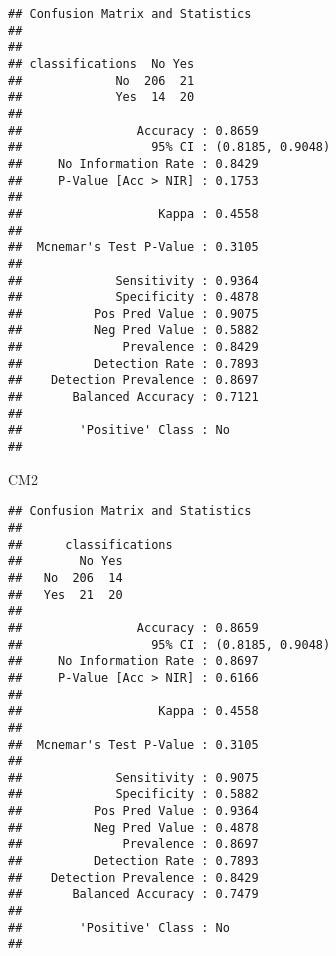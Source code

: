 \documentclass[]{article}
\newenvironment{Shaded}{\begin{snugshade}}{\end{snugshade}}
\newcommand{\NormalTok}[1]{#1}
\begin{document}
\begin{verbatim}
## Confusion Matrix and Statistics
## 
##                
## classifications  No Yes
##             No  206  21
##             Yes  14  20
##                                           
##                Accuracy : 0.8659          
##                  95% CI : (0.8185, 0.9048)
##     No Information Rate : 0.8429          
##     P-Value [Acc > NIR] : 0.1753          
##                                           
##                   Kappa : 0.4558          
##                                           
##  Mcnemar's Test P-Value : 0.3105          
##                                           
##             Sensitivity : 0.9364          
##             Specificity : 0.4878          
##          Pos Pred Value : 0.9075          
##          Neg Pred Value : 0.5882          
##              Prevalence : 0.8429          
##          Detection Rate : 0.7893          
##    Detection Prevalence : 0.8697          
##       Balanced Accuracy : 0.7121          
##                                           
##        'Positive' Class : No              
## 
\end{verbatim}

\begin{Shaded}
\begin{Highlighting}[]
\NormalTok{CM2}
\end{Highlighting}
\end{Shaded}

\begin{verbatim}
## Confusion Matrix and Statistics
## 
##      classifications
##        No Yes
##   No  206  14
##   Yes  21  20
##                                           
##                Accuracy : 0.8659          
##                  95% CI : (0.8185, 0.9048)
##     No Information Rate : 0.8697          
##     P-Value [Acc > NIR] : 0.6166          
##                                           
##                   Kappa : 0.4558          
##                                           
##  Mcnemar's Test P-Value : 0.3105          
##                                           
##             Sensitivity : 0.9075          
##             Specificity : 0.5882          
##          Pos Pred Value : 0.9364          
##          Neg Pred Value : 0.4878          
##              Prevalence : 0.8697          
##          Detection Rate : 0.7893          
##    Detection Prevalence : 0.8429          
##       Balanced Accuracy : 0.7479          
##                                           
##        'Positive' Class : No              
## 
\end{verbatim}
\end{document}
